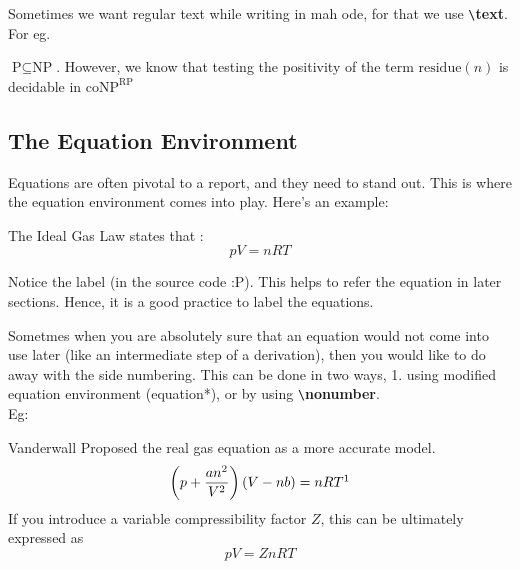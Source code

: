 \documentclass[12pt, letterpaper]{article}
\theoremstyle{remark}
\begin{document}
    Sometimes we want regular text while writing in mah ode, for that we use \verb!\!\textbf{text}.
    For eg. 
    \begin{center}
        $\text{P} \subseteq \text{NP}$. However, we know that testing the positivity of the term
        $\text{residue}(n)$ is decidable in $\text{coNP}^{\text{RP}}$
    \end{center}

    \subsection{The Equation Environment}
    Equations are often pivotal to a report, and they need to stand out. This is where
    the equation environment comes into play. Here's an example: 
    
    \begin{center}
        The Ideal Gas Law states that : 
        \begin{equation}
            pV=nRT
            \label{gaslaw}
        \end{equation}
    \end{center}

    Notice the label (in the source code :P). This helps to refer the equation in later sections.
    Hence, it is a good practice to label the equations.

    Sometmes when you are absolutely sure that an equation would not come into use later (like an intermediate step of a derivation),
    then you would like to do away with the side numbering. This can be done in two ways, 1. using modified equation environment (equation*),
    or by using \verb!\!\textbf{nonumber}. \\ Eg:

    \begin{center}
        Vanderwall Proposed the real gas equation as a more accurate model.
        \begin{equation*}
            \left(p+\frac{an^2}{V^2}\right)(V-nb)=nRT \footnotemark 
        \end{equation*} 
        If you introduce a variable compressibility factor $Z$, this can be ultimately
        expressed as 
        \begin{equation}
            pV=ZnRT \nonumber
        \end{equation}
    \end{center}
\end{document}

